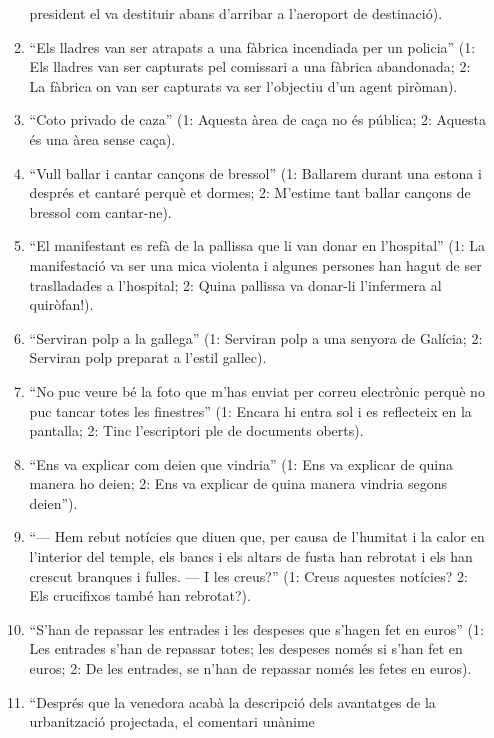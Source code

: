 \begin{enumerate}
\begin{enumerate}
        president el va destituir abans d'arribar a l'aeroport de
        destinació).
      \item ``Els lladres van ser atrapats a una fàbrica incendiada
      per un policia'' (1: Els lladres van ser capturats pel comissari
      a una fàbrica abandonada; 2: La fàbrica on van ser capturats va
      ser l'objectiu d'un agent piròman).
      \item ``Coto privado de caza'' (1: Aquesta àrea de caça no és pública;
      2: Aquesta és una àrea sense caça).
    \item ``Vull ballar i cantar cançons de bressol'' (1: Ballarem
      durant una estona i després et cantaré perquè et dormes; 2:
      M'estime tant ballar cançons de bressol com cantar-ne).
      \item ``El manifestant es refà de la pallissa que li van donar en
      l'hospital'' (1: La manifestació va ser una mica violenta i
      algunes persones han hagut de ser traslladades a l'hospital; 2:
      Quina pallissa va donar-li l'infermera al quiròfan!).
      \item ``Serviran polp a la gallega'' (1: Serviran polp a una
        senyora de Galícia; 2: Serviran polp preparat a l'estil
        gallec).
      \item ``No puc veure bé la foto que m'has enviat per correu
        electrònic perquè no puc tancar totes les finestres'' (1:
        Encara hi entra sol i es reflecteix en la pantalla; 2: Tinc
        l'escriptori ple de documents oberts).
      \item ``Ens va explicar com deien que vindria'' (1: Ens va
        explicar de quina manera ho deien; 2: Ens va explicar de quina
        manera vindria segons deien'').
      \item ``--- Hem rebut notícies que diuen que, per causa de
        l'humitat i la calor en l'interior del temple, els bancs i els
        altars de fusta han rebrotat i els han crescut branques i
        fulles.  --- I les creus?'' (1: Creus aquestes notícies? 2:
        Els crucifixos també han rebrotat?).
      \item ``S'han de repassar les entrades i les despeses que
        s'hagen fet en euros'' (1: Les entrades s'han de repassar
        totes; les despeses només si s'han fet en euros; 2: De les
        entrades, se n'han de repassar només les fetes en euros).
      \item ``Després que la venedora acabà la descripció dels
        avantatges de la urbanització projectada, el comentari unànime

\end{enumerate}
\end{enumerate}
